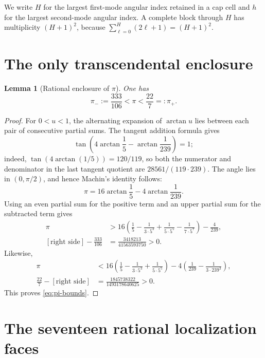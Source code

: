 \documentclass[11pt]{article}
\newtheorem{lemma}{Lemma}
\newcommand{\pimin}{\pi_-}
\newcommand{\pimax}{\pi_+}
\begin{document}
We write \(H\) for the largest first-mode angular index retained in a cap
cell and \(h\) for the largest second-mode angular index.  A complete block
through \(H\) has multiplicity \((H+1)^2\), because
\(\sum_{\ell=0}^{H}(2\ell+1)=(H+1)^2\).

\section{The only transcendental enclosure}

\begin{lemma}[Rational enclosure of \(\pi\)]
\label{lem:pi}
One has
\begin{equation}
 \pimin:=\frac{333}{106}<\pi<\frac{22}{7}=: \pimax.
 \label{eq:pi-bounds}
\end{equation}
\end{lemma}

\begin{proof}
For \(0<u<1\), the alternating expansion of \(\arctan u\) lies between
each pair of consecutive partial sums.  The tangent addition formula gives
\[
 \tan\!\left(4\arctan\frac15-\arctan\frac1{239}\right)=1;
\]
indeed, \(\tan(4\arctan(1/5))=120/119\), so both the numerator and
denominator in the last tangent quotient are \(28561/(119\cdot239)\).
The angle lies in \((0,\pi/2)\), and hence Machin's identity follows:
\[
 \pi=16\arctan\frac15-4\arctan\frac1{239}.
\]
Using an even partial sum for the positive term and an upper partial sum
for the subtracted term gives
\begin{align*}
 \pi
 &>16\left(\frac15-\frac1{3\cdot5^3}
       +\frac1{5\cdot5^5}-\frac1{7\cdot5^7}\right)-\frac4{239},\\
 \left[\text{right side}\right]-\frac{333}{106}
 &=\frac{3418213}{41563593750}>0.
\end{align*}
Likewise,
\begin{align*}
 \pi
 &<16\left(\frac15-\frac1{3\cdot5^3}
       +\frac1{5\cdot5^5}\right)
       -4\left(\frac1{239}-\frac1{3\cdot239^3}\right),\\
 \frac{22}{7}-\left[\text{right side}\right]
 &=\frac{1845738322}{1493178640625}>0.
\end{align*}
This proves \eqref{eq:pi-bounds}.
\end{proof}

\section{The seventeen rational localization faces}
\end{document}
